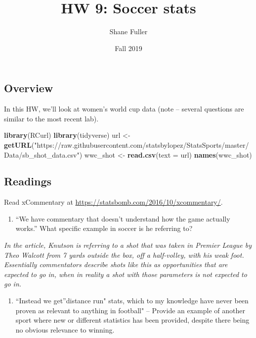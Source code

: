 \documentclass[]{article}
\title{HW 9: Soccer stats}
\author{Shane Fuller}
\date{Fall 2019}
\newenvironment{Shaded}{\begin{snugshade}}{\end{snugshade}}
\newcommand{\DataTypeTok}[1]{\textcolor[rgb]{0.13,0.29,0.53}{#1}}
\newcommand{\KeywordTok}[1]{\textcolor[rgb]{0.13,0.29,0.53}{\textbf{#1}}}
\newcommand{\NormalTok}[1]{#1}
\newcommand{\StringTok}[1]{\textcolor[rgb]{0.31,0.60,0.02}{#1}}
\providecommand{\tightlist}{%
  \setlength{\itemsep}{0pt}\setlength{\parskip}{0pt}}
\begin{document}
\maketitle

\hypertarget{overview}{%
\subsection{Overview}\label{overview}}

In this HW, we'll look at women's world cup data (note -- several
questions are similar to the most recent lab).

\begin{Shaded}
\begin{Highlighting}[]
\KeywordTok{library}\NormalTok{(RCurl)}
\KeywordTok{library}\NormalTok{(tidyverse)}
\NormalTok{url <-}\StringTok{ }\KeywordTok{getURL}\NormalTok{(}\StringTok{"https://raw.githubusercontent.com/statsbylopez/StatsSports/master/Data/sb_shot_data.csv"}\NormalTok{)}
\NormalTok{wwc_shot <-}\StringTok{ }\KeywordTok{read.csv}\NormalTok{(}\DataTypeTok{text =}\NormalTok{ url)}
\KeywordTok{names}\NormalTok{(wwc_shot)}
\end{Highlighting}
\end{Shaded}

\hypertarget{readings}{%
\subsection{Readings}\label{readings}}

Read xCommentary at \url{https://statsbomb.com/2016/10/xcommentary/}.

\begin{enumerate}
\def\labelenumi{\arabic{enumi}.}
\tightlist
\item
  ``We have commentary that doesn't understand how the game actually
  works.'' What specific example in soccer is he referring to?
\end{enumerate}

\emph{In the article, Knutson is referring to a shot that was taken in
Premier League by Theo Walcott from 7 yards outside the box, off a
half-volley, with his weak foot. Essentially commentators describe shots
like this as opportunities that are expected to go in, when in reality a
shot with those parameters is not expected to go in.}

\begin{enumerate}
\def\labelenumi{\arabic{enumi}.}
\setcounter{enumi}{1}
\tightlist
\item
  ``Instead we get''distance run" stats, which to my knowledge have
  never been proven as relevant to anything in football" -- Provide an
  example of another sport where new or different statistics has been
  provided, despite there being no obvious relevance to winning.
\end{enumerate}
\end{document}
